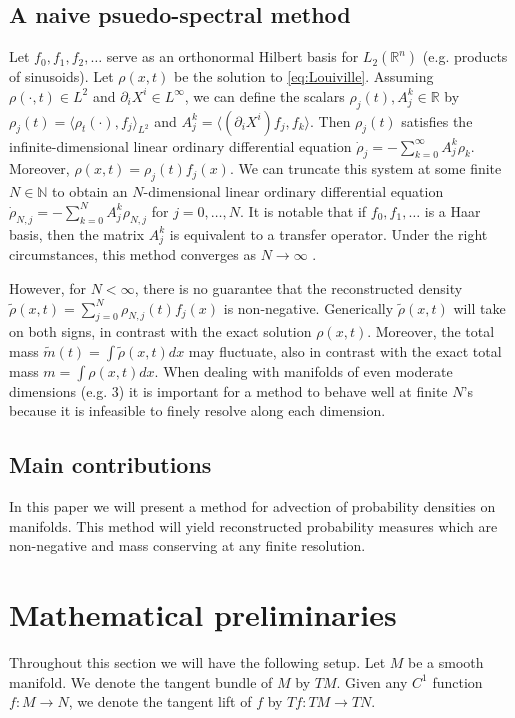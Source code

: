 \documentclass[letterpaper, 10 pt, conference]{ieeeconf}
\newcommand{\R}{\mathbb{R}}
\begin{document}
\subsection{A naive psuedo-spectral method}
\label{sec:naive}
  Let $f_0,f_1,f_2,\dots$ serve as an
  orthonormal Hilbert basis
  for $L_2(\R^n)$ (e.g. products of sinusoids).
  Let $\rho(x,t)$ be the solution to \eqref{eq:Louiville}.
  Assuming $\rho(\cdot,t) \in L^2$ and $\partial_i X^i \in L^{\infty}$,
  we can define the scalars $\rho_j(t), A^k_j \in \R$
  by $\rho_j(t) = \langle \rho_t( \cdot ) , f_j \rangle_{L^2}$
  and $A^k_j = \langle (\partial_i X^i) f_j , f_k \rangle$.
  Then $\rho_j(t)$ satisfies the infinite-dimensional linear
  ordinary differential equation
  $
    \dot{\rho}_j = - \sum_{k=0}^{\infty}A^k_j \rho_k
  $.
  Moreover, $\rho(x,t) = \rho_j(t) f_j(x)$.
  We can truncate this system at some finite $N \in \mathbb{N}$
  to obtain an $N$-dimensional linear ordinary differential equation
  $\dot{\rho}_{N,j} = -\sum_{k=0}^{N} A^k_j \rho_{N,j}$ for $j=0,\dots,N$.
  It is notable that if $f_0,f_1,\dots$ is a Haar basis, then the matrix
  $A^k_j$ is equivalent to a transfer operator.
  Under the right circumstances,
  this method converges as $N \to \infty$
  \cite{FroylandJungeKoltai2013}.

  However, for $N < \infty$, there is no guarantee that the reconstructed
  density $\tilde{\rho}(x,t) = \sum_{j=0}^N \rho_{N,j}(t) f_j(x)$
  is non-negative.
  Generically $\tilde{\rho}(x,t)$ will take on both signs, in
  contrast with the exact solution $\rho(x,t)$.
  Moreover, the total mass $\tilde{m}(t) = \int \tilde{\rho}(x,t)dx$
  may fluctuate, also in contrast with the exact total mass
  $m = \int \rho(x,t) dx$.
  When dealing with manifolds of even moderate dimensions
  (e.g. $3$) it is important for a method to behave well at finite $N$'s
  because it is infeasible to finely resolve along each dimension.

\subsection{Main contributions}
  In this paper we will present a method for advection of
  probability densities on manifolds.
  This method will yield reconstructed probability measures
  which are non-negative and mass conserving at any finite resolution.

\section{Mathematical preliminaries}
\label{sec:math}
  Throughout this section we will have the following
  setup.  Let $M$ be a smooth manifold.
  We denote the tangent bundle of $M$ by $TM$.
  Given any $C^1$ function $f:M \to N$,
  we denote the tangent lift of $f$ by $Tf:TM \to TN$.
\end{document}
